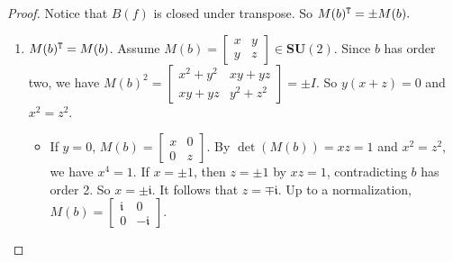 \begin{proof}
    Notice that $B(f)$ is closed under transpose. 
    So $M(b)^{\tt T}=\pm M(b).$
    \begin{enumerate}
        \item $M(b)^{\tt T}=M(b)$.
        Assume $M(b)=\left[\begin{matrix}
            x & y\\
            y & z
        \end{matrix}\right]\in \mathbf{SU}(2).$
        Since $b$ has order two,
        we have $M(b)^2=\left[\begin{matrix}
            x^2+y^2 & xy+yz\\
            xy+yz & y^2+z^2
        \end{matrix}\right]=\pm I.$
        So $y(x+z)=0$ and $x^2=z^2.$
        \begin{itemize}
            \item 
            If $y=0$, $M(b)=\left[\begin{matrix}
            x & 0\\
            0 & z
            \end{matrix}\right].$
            By $\det(M(b))=xz=1$ and $x^2=z^2$, we have $x^4=1$.
            If $x=\pm 1$, then $z=\pm 1$ by $xz=1$, contradicting $b$ has order 2.
            So $x=\pm \mathfrak{i}.$
            It follows that $z=\mp \mathfrak{i}.$
            Up to a normalization, $M(b)=\left[\begin{matrix}
                \mathfrak{i} & 0\\
                0 & -\mathfrak{i}
            \end{matrix}\right].$


\end{itemize}
\end{enumerate}
\end{proof}
